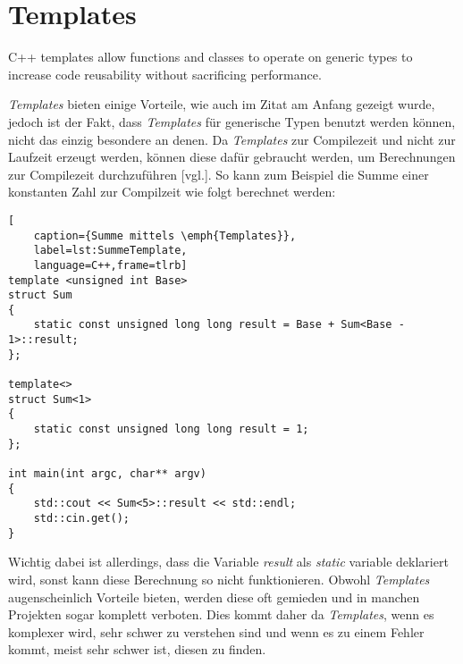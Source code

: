 \section{Templates}\label{sec:templates}
\begin{zitat}
    C++ templates allow functions and classes to operate on generic types to increase code
    reusability without sacrificing performance. \cite{TemplatesVorteil}
\end{zitat}
\emph{Templates} bieten einige Vorteile, wie auch im Zitat am Anfang gezeigt wurde, jedoch ist der
Fakt, dass \emph{Templates} für generische Typen benutzt werden können, nicht das einzig
besondere an denen.
\newline
\newline
Da \emph{Templates} zur Compilezeit und nicht zur Laufzeit erzeugt werden, können diese dafür
gebraucht werden, um Berechnungen zur Compilezeit durchzuführen \cite{HandsOn}[vgl.]. So kann zum
Beispiel die Summe einer konstanten Zahl zur Compilzeit wie folgt berechnet werden:
\begin{lstlisting}[
    caption={Summe mittels \emph{Templates}},
    label=lst:SummeTemplate,
    language=C++,frame=tlrb]
template <unsigned int Base>
struct Sum
{
	static const unsigned long long result = Base + Sum<Base - 1>::result;
};

template<>
struct Sum<1>
{
	static const unsigned long long result = 1;
};

int main(int argc, char** argv)
{
	std::cout << Sum<5>::result << std::endl;
	std::cin.get();
}
\end{lstlisting}

Wichtig dabei ist allerdings, dass die Variable \emph{result} als \emph{static} variable
deklariert wird, sonst kann diese Berechnung so nicht funktionieren.
\newline
\newline
Obwohl \emph{Templates} augenscheinlich Vorteile bieten, werden diese oft gemieden und in manchen
Projekten sogar komplett verboten. Dies kommt daher da \emph{Templates}, wenn es komplexer wird,
sehr schwer zu verstehen sind und wenn es zu einem Fehler kommt, meist sehr schwer ist, diesen zu
finden.
